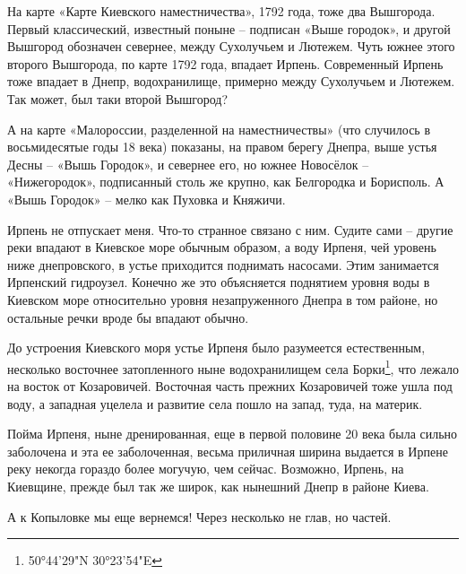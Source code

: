 На карте «Карте Киевского наместничества», 1792 года, тоже два Вышгорода. Первый классический, известный поныне – подписан «Выше городок», и другой Вышгород обозначен севернее, между Сухолучьем и Лютежем. Чуть южнее этого второго Вышгорода, по карте 1792 года, впадает Ирпень. Современный Ирпень тоже впадает в Днепр, водохранилище, примерно между Сухолучьем и Лютежем. Так может, был таки второй Вышгород?

А на карте «Малороссии, разделенной на наместничествы» (что случилось в восьмидесятые годы 18 века) показаны, на правом берегу Днепра, выше устья Десны – «Вышь Городок», и севернее его, но южнее Новосёлок – «Нижегородок», подписанный столь же крупно, как Белгородка и Борисполь. А «Вышь Городок» – мелко как Пуховка и Княжичи.

Ирпень не отпускает меня. Что-то странное связано с ним. Судите сами – другие реки впадают в Киевское море обычным образом, а воду Ирпеня, чей уровень ниже днепровского, в устье приходится поднимать насосами. Этим занимается Ирпенский гидроузел. Конечно же это объясняется поднятием уровня воды в Киевском море относительно уровня незапруженного Днепра в том районе, но остальные речки вроде бы впадают обычно.

До устроения Киевского моря устье Ирпеня было разумеется естественным, несколько восточнее затопленного ныне водохранилищем села Борки\footnote{50°44'29"N 30°23'54"E}, что лежало на восток от Козаровичей. Восточная часть прежних Козаровичей тоже ушла под воду, а западная уцелела и развитие села пошло на запад, туда, на материк.

Пойма Ирпеня, ныне дренированная, еще в первой половине 20 века была сильно заболочена и эта ее заболоченная, весьма приличная ширина выдается в Ирпене реку некогда гораздо более могучую, чем сейчас. Возможно, Ирпень, на Киевщине, прежде был так же широк, как нынешний Днепр в районе Киева.

А к Копыловке мы еще вернемся! Через несколько не глав, но частей.



